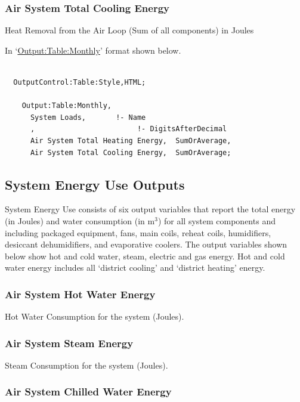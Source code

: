 \subsubsection{Air System Total Cooling Energy}\label{air-system-total-cooling-energy}

Heat Removal from the Air Loop (Sum of all components) in Joules

In `\hyperref[outputtablemonthly]{Output:Table:Monthly}' format shown below.

\begin{lstlisting}

  OutputControl:Table:Style,HTML;

    Output:Table:Monthly,
      System Loads,       !- Name
      ,                        !- DigitsAfterDecimal
      Air System Total Heating Energy,  SumOrAverage,
      Air System Total Cooling Energy,  SumOrAverage;
\end{lstlisting}

\subsection{System Energy Use Outputs}\label{system-energy-use-outputs}

System Energy Use consists of six output variables that report the total energy (in Joules) and water consumption (in m\(^{3}\)) for all system components and including packaged equipment, fans, main coils, reheat coils, humidifiers, desiccant dehumidifiers, and evaporative coolers. The output variables shown below show hot and cold water, steam, electric and gas energy. Hot and cold water energy includes all `district cooling' and `district heating' energy.

\subsubsection{Air System Hot Water Energy}\label{air-system-hot-water-energy}

Hot Water Consumption for the system (Joules).

\subsubsection{Air System Steam Energy}\label{air-system-steam-energy}

Steam Consumption for the system (Joules).

\subsubsection{Air System Chilled Water Energy}\label{air-system-chilled-water-energy}

